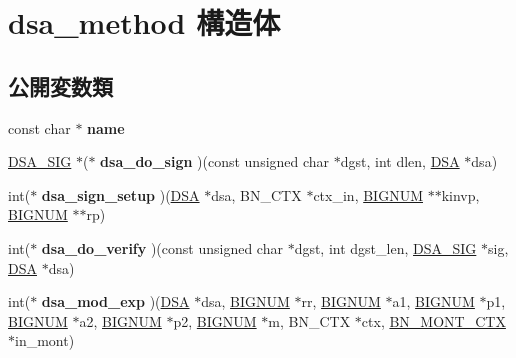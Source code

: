 \hypertarget{structdsa__method}{}\section{dsa\+\_\+method 構造体}
\label{structdsa__method}
\subsection*{公開変数類}
\begin{DoxyCompactItemize}
\item 
\hypertarget{structdsa__method_a83d504a9d8609d6172a7e4a824791933}{}const char $\ast$ {\bfseries name}\label{structdsa__method_a83d504a9d8609d6172a7e4a824791933}

\item 
\hypertarget{structdsa__method_acac9dacfe7fd6637af11f0280ed087ad}{}\hyperlink{struct_d_s_a___s_i_g__st}{D\+S\+A\+\_\+\+S\+I\+G} $\ast$($\ast$ {\bfseries dsa\+\_\+do\+\_\+sign} )(const unsigned char $\ast$dgst, int dlen, \hyperlink{structdsa__st}{D\+S\+A} $\ast$dsa)\label{structdsa__method_acac9dacfe7fd6637af11f0280ed087ad}

\item 
\hypertarget{structdsa__method_a6c731fb594e9d87b38351caf21b52f72}{}int($\ast$ {\bfseries dsa\+\_\+sign\+\_\+setup} )(\hyperlink{structdsa__st}{D\+S\+A} $\ast$dsa, B\+N\+\_\+\+C\+T\+X $\ast$ctx\+\_\+in, \hyperlink{structbignum__st}{B\+I\+G\+N\+U\+M} $\ast$$\ast$kinvp, \hyperlink{structbignum__st}{B\+I\+G\+N\+U\+M} $\ast$$\ast$rp)\label{structdsa__method_a6c731fb594e9d87b38351caf21b52f72}

\item 
\hypertarget{structdsa__method_a48d8dcf12cd14676633cde4b06dbe1c5}{}int($\ast$ {\bfseries dsa\+\_\+do\+\_\+verify} )(const unsigned char $\ast$dgst, int dgst\+\_\+len, \hyperlink{struct_d_s_a___s_i_g__st}{D\+S\+A\+\_\+\+S\+I\+G} $\ast$sig, \hyperlink{structdsa__st}{D\+S\+A} $\ast$dsa)\label{structdsa__method_a48d8dcf12cd14676633cde4b06dbe1c5}

\item 
\hypertarget{structdsa__method_a6295bfda1f4be2fc9e04e69c6a104f4d}{}int($\ast$ {\bfseries dsa\+\_\+mod\+\_\+exp} )(\hyperlink{structdsa__st}{D\+S\+A} $\ast$dsa, \hyperlink{structbignum__st}{B\+I\+G\+N\+U\+M} $\ast$rr, \hyperlink{structbignum__st}{B\+I\+G\+N\+U\+M} $\ast$a1, \hyperlink{structbignum__st}{B\+I\+G\+N\+U\+M} $\ast$p1, \hyperlink{structbignum__st}{B\+I\+G\+N\+U\+M} $\ast$a2, \hyperlink{structbignum__st}{B\+I\+G\+N\+U\+M} $\ast$p2, \hyperlink{structbignum__st}{B\+I\+G\+N\+U\+M} $\ast$m, B\+N\+\_\+\+C\+T\+X $\ast$ctx, \hyperlink{structbn__mont__ctx__st}{B\+N\+\_\+\+M\+O\+N\+T\+\_\+\+C\+T\+X} $\ast$in\+\_\+mont)\label{structdsa__method_a6295bfda1f4be2fc9e04e69c6a104f4d}


\end{DoxyCompactItemize}
